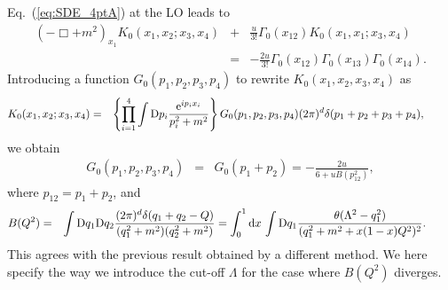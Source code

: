 \documentclass[preprint]{ptephy_v1}%
\newcommand{\rme}{{\rm e}}
\newcommand{\rmd}{{\rm d}}
\newcommand{\rmD}{{\rm D}}
\begin{document}
 Eq.~(\ref{eq:SDE_4ptA}) at the LO  leads to
\begin{eqnarray}
 (- \Box +m^2)_{x_1} K_0(x_1,x_2;x_3,x_4)
&+&\frac{ u}{3! } \Gamma_0(x_{12})K_0(x_1,x_1;x_3,x_4)\nonumber \\
&=& -\frac{ 2 u}{3! } 
\Gamma_0(x_{12})\Gamma_0(x_{13})\Gamma_0(x_{14}) .
\end{eqnarray}
 Introducing a function $G_0(p_1,p_2,p_3,p_4)$ to rewrite $K_0(x_1,x_2,x_3,x_4)$ as
\begin{eqnarray}
K_0(x_1,x_2;x_3,x_4) &=& \left\{\prod_{i=1}^4 \int  \rmD p_i \frac{\rme^{i p_i x_i}}{p_i^2+m^2}\right\}
G_0(p_1,p_2,p_3,p_4)(2\pi)^d \delta(p_1+p_2+p_3+p_4),~~~~~~~~
\end{eqnarray}
we obtain 
\begin{eqnarray} 
G_0(p_1,p_2,p_3,p_4) &=& G_0(p_1+p_2) = -\frac{2 u}{6+ u B(p_{12}^2)},
\label{eq:4pt_LO}
\end{eqnarray}
where $p_{12}=p_1+p_2$, and 
\begin{eqnarray}
B(Q^2) &=& \int {\rmD}q_1 {\rmD}q_2 \frac{(2\pi)^d\delta(q_1+q_2-Q)}{(q_1^2+m^2)(q_2^2+m^2)} 
= \int_0^1  \rmd x\,  \int {\rmD}q_1 \frac{ \theta(\Lambda^2-q_1^2)}{(q_1^2+m^2+ x(1-x) Q^2)^2}  . ~~~~~~~
\end{eqnarray}
 This agrees with the previous result obtained by a different method\cite{Aoki:2014yra}.
We here specify the way we introduce the cut-off $\Lambda$ for the case where $B(Q^2)$ diverges.
\end{document}
